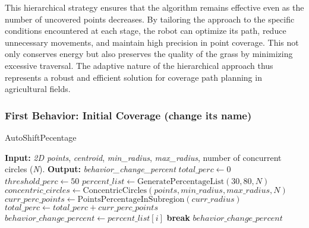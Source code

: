 \vspace*{6mm}   


This hierarchical strategy ensures that the algorithm remains effective even as the number of uncovered points decreases. By tailoring the approach to the specific conditions encountered at each stage, the robot can optimize its path, reduce unnecessary movements, and maintain high precision in point coverage. This not only conserves energy but also preserves the quality of the grass by minimizing excessive traversal. The adaptive nature of the hierarchical approach thus represents a robust and efficient solution for coverage path planning in agricultural fields.

\vspace*{6mm}  

\subsubsection{First Behavior: Initial Coverage (change its name)}


\begin{algorithm}
    \caption{AutoShiftPecentage}
    \begin{algorithmic}[1]
    \Statex \textbf{Input: } \textit{2D points}, \textit{centroid}, \textit{min\_radius}, \textit{max\_radius}, number of concurrent circles (\textit{N}).
    \Statex \textbf{Output: }\textit{behavior\_change\_percent}
    \newline
    \State $total\_perc \gets 0$
    \State $threshold\_perc \gets 50$
    \State $percent\_list \gets \text{GeneratePercentageList}(30, 80, N)$ 
    \State $concentric\_circles \gets \text{ConcentricCircles}(points, min\_radius, max\_radius, N)$
        \State $curr\_perc\_points \gets \text{PointsPercentageInSubregion}(curr\_radius)$
        \State $total\_perc \gets total\_perc + curr\_perc\_points$
            \State $behavior\_change\_percent \gets percent\_list[i]$
            \State \textbf{break}
        \EndIf
    \EndFor
    \State \Return $behavior\_change\_percent$
    \end{algorithmic}
\end{algorithm}




